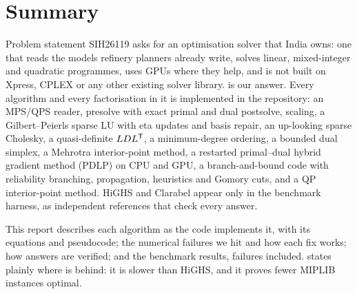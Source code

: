 \section*{Summary}

Problem statement SIH26119 asks for an optimisation solver that India owns: one that reads the
models refinery planners already write, solves linear, mixed-integer and quadratic programmes,
uses GPUs where they help, and is not built on Xpress, CPLEX or any other existing solver library.
\nirnay{} is our answer. Every algorithm and every factorisation in it is implemented in the
repository: an MPS/QPS reader, presolve with exact primal and dual postsolve, scaling, a
Gilbert--Peierls sparse LU with eta updates and basis repair, an up-looking sparse Cholesky, a
quasi-definite $LDL^{\mathsf{T}}$, a minimum-degree ordering, a bounded dual simplex, a Mehrotra
interior-point method, a restarted primal--dual hybrid gradient method (PDLP) on CPU and GPU, a
branch-and-bound code with reliability branching, propagation, heuristics and Gomory cuts, and a
QP interior-point method. HiGHS and Clarabel appear only in the benchmark harness, as independent
references that check every answer.

This report describes each algorithm as the code implements it, with its equations and
pseudocode; the numerical failures we hit and how each fix works; how answers are verified; and
the benchmark results, failures included.  states plainly where \nirnay{} is behind:
it is slower than HiGHS, and it proves fewer MIPLIB instances optimal.

\begin{keybox}
\centering
{}\hfill
{}\hfill
{}\hfill
{}
\par\medskip
{}\hfill
{}\hfill
{}\hfill
{}
\end{keybox}

